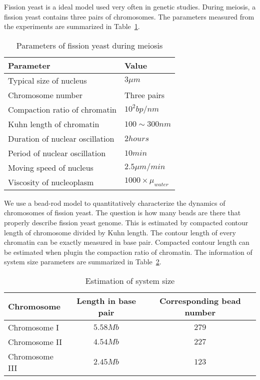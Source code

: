 \documentclass{article}
\begin{document}
Fission yeast is a ideal model used very often in genetic studies. During meiosis, a fission yeast contains three pairs of chromosomes. The parameters measured from the experiments are summarized in Table~\ref{tab:parameters}.
\begin{table}[!ht]
	\caption{Parameters of fission yeast during meiosis}
	\label{tab:parameters}
	\begin{tabular}{l|l}
		\hline
		\textbf{Parameter} & \textbf{Value} \\
		\hline
		Typical size of nucleus          &  $3\mu m$ \\
		Chromosome number                &  Three pairs \\
		Compaction ratio of chromatin    &  $10^2bp/nm$ \\
                Kuhn length of chromatin         &  $100\sim300nm$  \\
		Duration of nuclear oscillation  &  $2 hours$  \\
		Period of nuclear oscillation    &  $10 min$  \\
		Moving speed of nucleus          &  $2.5\mu m/min$ \\
		Viscosity of nucleoplasm         &  $1000\times \mu_{water}$ \\
		\hline
	\end{tabular}

\end{table}

We use a bead-rod model to quantitatively characterize the dynamics of chromosomes of fission yeast. 
The question is how many beads are there that properly describe fission yeast genome. This is estimated by compacted contour length of chromosome divided by Kuhn length. 
The contour length of every chromatin can be exactly measured in base pair. Compacted contour length can be estimated when plugin the compaction ratio of chromatin.
The information of system size parameters are summarized in Table~\ref{tab:size}.
\begin{table}[!ht]
	\caption{Estimation of system size}
	\label{tab:size}
	\begin{tabular}{l|c|c}
		\hline
		\textbf{Chromosome} & \textbf{Length in base pair} & \textbf{Corresponding bead number} \\
		\hline
                Chromosome I   & $5.58Mb$  & $279$ \\
                Chromosome II  & $4.54Mb$  & $227$ \\
                Chromosome III & $2.45Mb$  & $123$ \\
		\hline
	\end{tabular}
\end{table}
\end{document}
